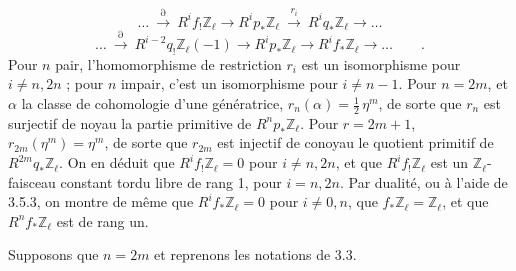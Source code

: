 \begin{equation}\tag{3.6.2}
\ldots \ \stackrel{\partial}{\longrightarrow}\ R^{i}f_{!}\mathbb{Z}_{\ell} \longrightarrow R^{i}p_{*}\mathbb{Z}_{\ell} \ \stackrel{r_{i}}{\longrightarrow}\ R^{i}q_{*}\mathbb{Z}_{\ell} \longrightarrow \ldots
\end{equation}
\begin{equation}\tag{3.6.3}
\ldots \ \stackrel{\partial}{\longrightarrow}\ R^{i-2}q_{!}\mathbb{Z}_{\ell}(-1) \longrightarrow R^{i}p_{*}\mathbb{Z}_{\ell} \longrightarrow R^{i}f_{*}\mathbb{Z}_{\ell} \longrightarrow \ldots \qquad .
\end{equation}
Pour $n$ pair, l'homomorphisme de restriction $r_{i}$ est un isomorphisme pour $i \neq n,2n$ ; pour $n$ impair, c'est un isomorphisme pour $i \neq n-1$. Pour $n = 2m$, et $\alpha$ la classe de cohomologie d'une génératrice, $r_{n}(\alpha) = \frac{1}{2}\,\eta^{m}$, de sorte que $r_{n}$ est surjectif de noyau la partie primitive de $R^{n}p_{*}\mathbb{Z}_{\ell}$. Pour $r = 2m + 1$, $r_{2m}(\eta^{m}) = \eta^{m}$, de sorte que $r_{2m}$ est injectif de conoyau le quotient primitif de $R^{2m}q_{*}\mathbb{Z}_{\ell}$. On en déduit que $R^{i}f_{!}\mathbb{Z}_{\ell} = 0$ pour $i \neq n,2n$, et que $R^{i}f_{!}\mathbb{Z}_{\ell}$ est un $\mathbb{Z}_{\ell}$-faisceau constant tordu libre de rang 1, pour $i = n,2n$. Par dualité, ou à l'aide de 3.5.3, on montre de même que $R^{i}f_{*}\mathbb{Z}_{\ell} = 0$ pour $i \neq 0,n$, que $f_{*}\mathbb{Z}_{\ell} = \mathbb{Z}_{\ell}$, et que $R^{n}f_{*}\mathbb{Z}_{\ell}$ est de rang un.

Supposons que $n = 2m$ et reprenons les notations de 3.3.



